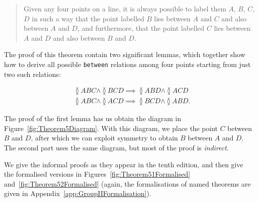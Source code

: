 \begin{quote}
Given any four points on a line, it is always possible to label them $A$, $B$, $C$, $D$ in such a way that the point labelled $B$ lies between $A$ and $C$ and also between $A$ and $D$, and furthermore, that the point labelled $C$ lies between $A$ and $D$ and also between $B$ and $D$.
\end{quote}

The proof of this theorem contain two significant lemmas, which together show how to derive all possible \texttt{between} relations among four points starting from just two such relations:

\begin{align}
&\between{A}{B}{C} \wedge \between{B}{C}{D} \implies \between{A}{B}{D} \wedge \between{A}{C}{D}\label{eq:five1}\\
&\between{A}{B}{C} \wedge \between{A}{C}{D} \implies \between{B}{C}{D} \wedge \between{A}{B}{D}\label{eq:five2}.
\end{align}

The proof of the first lemma has us obtain the diagram in Figure~\ref{fig:Theorem5Diagram}. With this diagram, we place the point $C$ between $B$ and $D$, after which we can exploit symmetry to obtain $B$ between $A$ and $D$. The second part uses the same diagram, but most of the proof is \emph{indirect}. 

We give the informal proofs as they appear in the tenth edition, and then give the formalised versions in Figures~\ref{fig:Theorem51Formalised} and~\ref{fig:Theorem52Formalised} (again, the formalisations of named theorems are given in Appendix~\ref{app:GroupIIFormalisation}).

